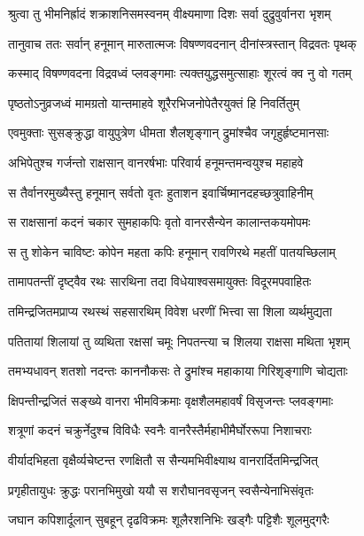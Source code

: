 
\twolineshloka
{श्रुत्वा तु भीमनिर्ह्रादं शक्राशनिसमस्वनम्}
{वीक्ष्यमाणा दिशः सर्वा दुद्रुवुर्वानरा भृशम्} %

\twolineshloka
{तानुवाच ततः सर्वान् हनूमान् मारुतात्मजः}
{विषण्णवदनान् दीनांस्त्रस्तान् विद्रवतः पृथक्} %

\twolineshloka
{कस्माद् विषण्णवदना विद्रवध्वं प्लवङ्गमाः}
{त्यक्तयुद्धसमुत्साहाः शूरत्वं क्व नु वो गतम्} %

\twolineshloka
{पृष्ठतोऽनुव्रजध्वं मामग्रतो यान्तमाहवे}
{शूरैरभिजनोपेतैरयुक्तं हि निवर्तितुम्} %

\twolineshloka
{एवमुक्ताः सुसङ्क्रुद्धा वायुपुत्रेण धीमता}
{शैलशृङ्गान् द्रुमांश्चैव जगृहुर्हृष्टमानसाः} %

\twolineshloka
{अभिपेतुश्च गर्जन्तो राक्षसान् वानरर्षभाः}
{परिवार्य हनूमन्तमन्वयुश्च महाहवे} %

\twolineshloka
{स तैर्वानरमुख्यैस्तु हनूमान् सर्वतो वृतः}
{हुताशन इवार्चिष्मानदहच्छत्रुवाहिनीम्} %

\twolineshloka
{स राक्षसानां कदनं चकार सुमहाकपिः}
{वृतो वानरसैन्येन कालान्तकयमोपमः} %

\twolineshloka
{स तु शोकेन चाविष्टः कोपेन महता कपिः}
{हनूमान् रावणिरथे महतीं पातयच्छिलाम्} %

\twolineshloka
{तामापतन्तीं दृष्ट्वैव रथः सारथिना तदा}
{विधेयाश्वसमायुक्तः विदूरमपवाहितः} %

\twolineshloka
{तमिन्द्रजितमप्राप्य रथस्थं सहसारथिम्}
{विवेश धरणीं भित्त्वा सा शिला व्यर्थमुद्यता} %

\twolineshloka
{पतितायां शिलायां तु व्यथिता रक्षसां चमूः}
{निपतन्त्या च शिलया राक्षसा मथिता भृशम्} %

\twolineshloka
{तमभ्यधावन् शतशो नदन्तः काननौकसः}
{ते द्रुमांश्च महाकाया गिरिशृङ्गाणि चोद्यताः} %

\twolineshloka
{क्षिपन्तीन्द्रजितं सङ्ख्ये वानरा भीमविक्रमाः}
{वृक्षशैलमहावर्षं विसृजन्तः प्लवङ्गमाः} %

\twolineshloka
{शत्रूणां कदनं चक्रुर्नेदुश्च विविधैः स्वनैः}
{वानरैस्तैर्महाभीमैर्घोररूपा निशाचराः} %

\twolineshloka
{वीर्यादभिहता वृक्षैर्व्यचेष्टन्त रणक्षितौ}
{स सैन्यमभिवीक्ष्याथ वानरार्दितमिन्द्रजित्} %

\twolineshloka
{प्रगृहीतायुधः क्रुद्धः परानभिमुखो ययौ}
{स शरौघानवसृजन् स्वसैन्येनाभिसंवृतः} %

\twolineshloka
{जघान कपिशार्दूलान् सुबहून् दृढविक्रमः}
{शूलैरशनिभिः खड्गैः पट्टिशैः शूलमुद्गरैः} %

